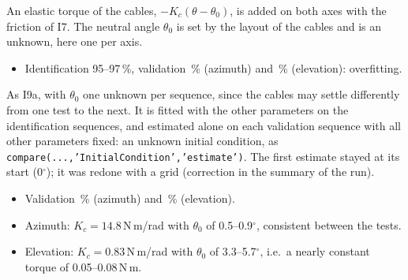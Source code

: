 \documentclass[10pt,a4paper]{article}
\numberwithin{equation}{section}
\begin{document}
\begin{description}
\begin{itemize}
  \end{itemize}
\item[I9a.] An elastic torque of the cables, $-K_c(\theta-\theta_0)$, is added on both axes with the friction of I7. The neutral angle $\theta_0$ is set by the layout of the cables and is an unknown, here one per axis.
  \begin{itemize}
  \item Identification 95--97\,\%, validation \ciINineaAzVal\,\% (azimuth) and \ciINineaElVal\,\% (elevation): overfitting.
  \end{itemize}
\item[I9b.] As I9a, with $\theta_0$ one unknown per sequence, since the cables may settle differently from one test to the next. It is fitted with the other parameters on the identification sequences, and estimated alone on each validation sequence with all other parameters fixed: an unknown initial condition, as \texttt{compare(...,'InitialCondition','estimate')}. The first estimate stayed at its start (0$^\circ$); it was redone with a grid (correction in the summary of the run).
  \begin{itemize}
  \item Validation \ciINinebAzVal\,\% (azimuth) and \ciINinebElVal\,\% (elevation).
  \item Azimuth: $K_c=14.8$\,N\,m/rad with $\theta_0$ of 0.5--0.9$^\circ$, consistent between the tests.
  \item Elevation: $K_c=0.83$\,N\,m/rad with $\theta_0$ of 3.3--5.7$^\circ$, i.e.\ a nearly constant torque of 0.05--0.08\,N\,m.
  \end{itemize}
\end{description}
\end{document}

